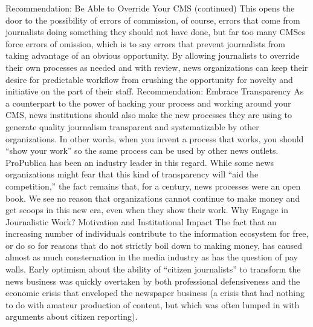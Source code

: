 Recommendation: Be Able to Override Your CMS (continued)
This opens the door to the possibility of errors of commission, of course,
errors that come from journalists doing something they should not
have done, but far too many CMSes force errors of omission, which is
to say errors that prevent journalists from taking advantage of an obvious
opportunity. By allowing journalists to override their own processes
as needed and with review, news organizations can keep their desire for
predictable workflow from crushing the opportunity for novelty and
initiative on the part of their staff.
Recommendation: Embrace Transparency
As a counterpart to the power of hacking your process and working
around your CMS, news institutions should also make the new processes
they are using to generate quality journalism transparent and
systematizable by other organizations. In other words, when you invent
a process that works, you should ``show your work'' so the same process
can be used by other news outlets. ProPublica has been an industry
leader in this regard. While some news organizations might fear that this
kind of transparency will ``aid the competition,'' the fact remains that,
for a century, news processes were an open book. We see no reason that
organizations cannot continue to make money and get scoops in this
new era, even when they show their work.
Why Engage in Journalistic Work? Motivation and Institutional Impact
The fact that an increasing number of individuals contribute to the information
ecosystem for free, or do so for reasons that do not strictly boil down to making
money, has caused almost as much consternation in the media industry as has the
question of pay walls. Early optimism about the ability of ``citizen journalists'' to
transform the news business was quickly overtaken by both professional defensiveness
and the economic crisis that enveloped the newspaper business (a crisis
that had nothing to do with amateur production of content, but which was often
lumped in with arguments about citizen reporting).

